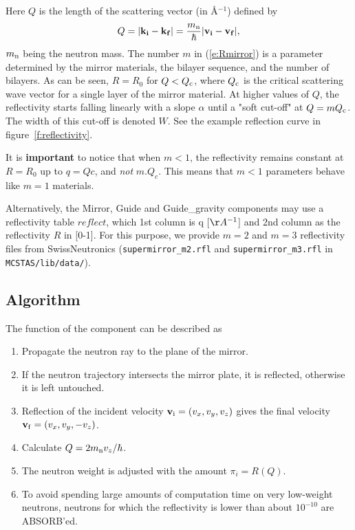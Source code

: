 Here $Q$ is the length of the scattering vector (in \AA$^{-1}$)
defined by
\begin{equation} \label{e:reflectivity}
Q = |{\bf k}_{\bf i} - {\bf k}_{\bf f}|
  = \frac{m_{\rm n}}{\hbar} |{\bf v}_{\bf i} - {\bf v}_{\bf f}|,
\end{equation}
$m_{\rm n}$ being the neutron mass.
The number $m$ in (\ref{e:Rmirror}) is a parameter determined by
the mirror materials,
the bilayer sequence, and the number of bilayers.
As can be seen, $R=R_0$ for $Q < Q_{\rm c}$, where $Q_{\rm c}$ is the
critical scattering wave vector for a single layer of the mirror
material. At higher values of $Q$, the reflectivity starts falling
linearly with a slope $\alpha$ until a "soft cut-off" at $Q = m Q_{\rm c}$.
The width of this cut-off is denoted $W$. See the example reflection curve in
figure~\ref{f:reflectivity}.

It is {\bf important} to notice that when $m < 1$, the reflectivity remains constant at $R=R_0$ up to $q=Qc$, and \emph{not} $m.Q_c$. This means that $m < 1$ parameters behave like $m=1$ materials.

Alternatively, the Mirror, Guide and Guide\_gravity components may use a reflectivity table $reflect$, which 1st column is q [$\AA^{-1}$] and 2nd column as the reflectivity $R$ in [0-1]. For this purpose, we provide $m=2$ and $m=3$ reflectivity files from SwissNeutronics (\verb+supermirror_m2.rfl+ and \verb+supermirror_m3.rfl+ in \verb+MCSTAS/lib/data/+).

\subsection{Algorithm}
The function of the component can be described as
\begin{enumerate}
\item Propagate the neutron ray to the plane of the mirror.
\item If the neutron trajectory intersects the mirror plate, it is
reflected, otherwise it is left untouched.
\item Reflection of the incident velocity
${\bf v}_{\rm i} = (v_x,v_y,v_z)$
gives the final velocity ${\bf v}_{\rm f} = (v_x,v_y,-v_z)$.
\item Calculate $Q=2 m_{\rm n} v_z / \hbar$.
\item The neutron weight is adjusted with the amount $\pi_i = R(Q)$.
\item  To avoid spending large amounts of computation time on very low-weight
neutrons, neutrons for which the reflectivity is lower than about
$10^{-10}$ are ABSORB'ed.
\end{enumerate}

